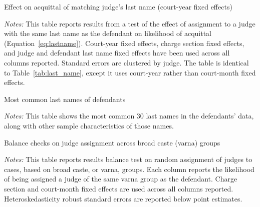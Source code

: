 \documentclass[12pt,english]{article}
\newcommand{\HOME}{\string~}
\newcommand{\curpath}{\HOME/ddl/justice-overleaf}
\newcommand{\curpath}{.}
\begin{document}
\begin{appendices}
\begin{table}[H]
  \caption{Effect on acquittal of matching judge's last name (court-year fixed effects)} 
  \begin{center}
   \footnotesize{}
   \label{tab:last_name_loc_year}
  \begin{minipage}{1.1\textwidth}
    \footnotesize \emph{Notes:} This table reports results from a test of the effect of assignment to a judge with the same last name as the defendant on likelihood of acquittal (Equation~\ref{eq:lastname}). Court-year fixed effects, charge section fixed effects, and judge and defendant last name fixed effects have been used across all columns reported. Standard errors are clustered by judge. The table is identical to Table~\ref{tab:last_name}, except it uses court-year rather than court-month fixed effects.
  \end{minipage}
  \end{center}
\end{table}

  \newpage
\begin{table}[H]
  \caption{Most common last names of defendants} 
  \begin{center}
   \footnotesize{}
   \label{tab:name_list}
  \begin{minipage}{\textwidth}
    \footnotesize \emph{Notes:} This table shows the most common 30 last names in the defendants' data, along with other sample characteristics of those names.
  \end{minipage}
  \end{center}
\end{table}

\begin{landscape}
\begin{table}[h!]
    \begin{center}
      \caption{Balance checks on judge assignment across broad caste (varna) groups}
      \label{tab:caste_balance}
      
      \begin{minipage}{1.35\textwidth}
    {\footnotesize \emph{Notes:} This table reports results balance test on random assignment of judges to cases, based on broad caste, or varna, groups. Each column reports the likelihood of being assigned a judge of the same varna group as the defendant. Charge section and court-month fixed effects are used across all columns reported. Heteroskedasticity robust standard errors are reported below point estimates. } \\
      \end{minipage}
      \end{center}
   \end{table}
\end{landscape}


\end{appendices}
\end{document}
